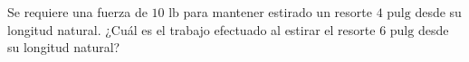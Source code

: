 \item Se requiere una fuerza de $10 \text{ lb}$ para mantener estirado un resorte $4 \text{ pulg}$ desde su longitud natural. ¿Cuál es el trabajo efectuado al estirar el resorte $6 \text{ pulg}$ desde su longitud natural?
